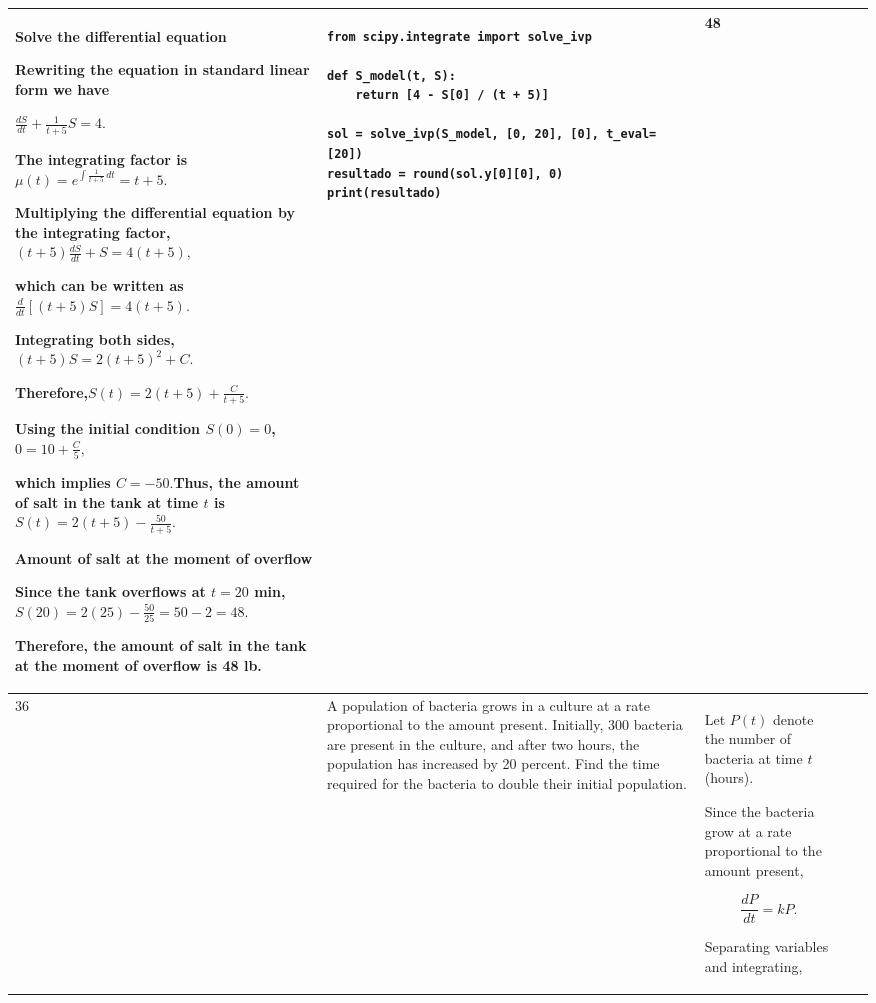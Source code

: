 \documentclass[a4paper,12pt]{article}
\begin{document}
\begin{longtable}{|p{0.3cm}|p{}|p{10cm}|p{}|p{1.5cm}|}
Solve the differential equation

Rewriting the equation in standard linear form we have

$
\frac{dS}{dt}+\frac{1}{t+5}S=4.
$

The integrating factor is $
\mu(t)=e^{\int\frac{1}{t+5}\,dt}
=t+5.
$

Multiplying the differential equation by the integrating factor, $
(t+5)\frac{dS}{dt}+S=4(t+5),
$

which can be written as $\frac{d}{dt}\left[(t+5)S\right]=4(t+5).$

Integrating both sides, $
(t+5)S
=2(t+5)^2+C.
$

Therefore,$S(t)=2(t+5)+\frac{C}{t+5}.$

Using the initial condition $S(0)=0$, $
0=10+\frac{C}{5},
$

which implies $
C=-50.
$Thus, the amount of salt in the tank at time $t$ is $
S(t)=2(t+5)-\frac{50}{t+5}.
$

Amount of salt at the moment of overflow

Since the tank overflows at $t=20$ min, $
S(20)
=2(25)-\frac{50}{25}
=50-2
=48.
$

Therefore, the amount of salt in the tank at the moment of overflow is 48 lb.









             &\begin{verbatim}
from scipy.integrate import solve_ivp

def S_model(t, S):
    return [4 - S[0] / (t + 5)]

sol = solve_ivp(S_model, [0, 20], [0], t_eval=[20])
resultado = round(sol.y[0][0], 0)
print(resultado)
\end{verbatim}& 48              \\ \hline
     36            & A population of bacteria grows in a culture at a rate proportional to the amount present. Initially, 300 bacteria are present in the culture, and after two hours, the population has increased by 20 percent. Find the time required for the bacteria to double their initial population. & Let \(P(t)\) denote the number of bacteria at time \(t\) (hours).

Since the bacteria grow at a rate proportional to the amount present,

$$
\frac{dP}{dt}=kP.
$$

Separating variables and integrating,


\end{longtable}
\end{document}
